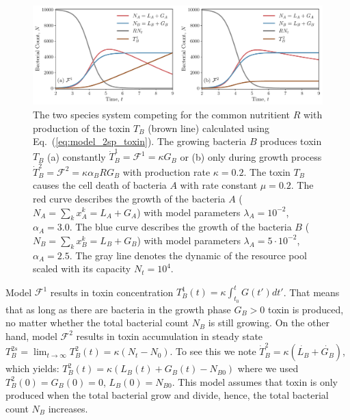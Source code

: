 \documentclass[10pt,A4paper]{article}
\begin{document}
\begin{figure}[H]
    \begin{center}
    \includegraphics[width=1.\textwidth]{Figures/pool_model_2pools_toxin.pdf}
    \caption{
        The two species system competing for the common nutritient $R$ with production of the toxin $T_B$ (brown line) calculated using Eq.~(\ref{eq:model_2sp_toxin}).
        The growing bacteria $B$ produces toxin $T_B$ (a) constantly $\dot{T}_B^1 = \mathcal{F}^1 = \kappa G_B$ or (b) only during growth process $\dot{T}_B^2 = \mathcal{F}^2 = \kappa \alpha_B R G_B$ with 
        production rate $\kappa=0.2$.
        The toxin $T_B$ causes the cell death of bacteria $A$ with rate constant $\mu = 0.2$.
        The red curve describes the growth of the bacteria $A$ ($N_A = \sum_{k} x_A^k = L_A+G_A$) with model parameters $\lambda_A=10^{-2}$, $\alpha_A=3.0$.
        The blue curve describes the growth of the bacteria $B$ ($N_B = \sum_{k} x_B^k = L_B+G_B$) with model parameters $\lambda_A=5\cdot 10^{-2}$, $\alpha_A=2.5$.
        The gray line denotes the dynamic of the resource pool scaled with its capacity $N_t=10^4$.
    }
    \label{fig:2pool_2sp_toxin}
    \end{center}
\end{figure}
%
Model $\mathcal{F}^1$ results in toxin concentration $T_B^1(t)=\kappa\int_{t_0}^tG(t')dt'$.
That means that as long as there are bacteria in the growth phase $G_B>0$ toxin is produced, no matter whether the total bacterial count $N_B$ is still growing.
On the other hand, model $\mathcal{F}^2$ results in toxin accumulation in steady state $T_B^{2s}=\lim_{t\to\infty}T_B^2(t)=\kappa(N_t-N_0)$.
To see this we note $\dot{T}_B^2=\kappa(\dot{L_B}+\dot{G_B})$, which yields: $T_B^2(t)=\kappa(L_B(t)+G_B(t)-N_{B0})$ where we used $T_B^2(0)=G_B(0)=0$, $L_B(0)=N_{B0}$.
This model assumes that toxin is only produced when the total bacterial grow and divide, hence, the total bacterial count $N_B$ increases.
%
%
\end{document}
